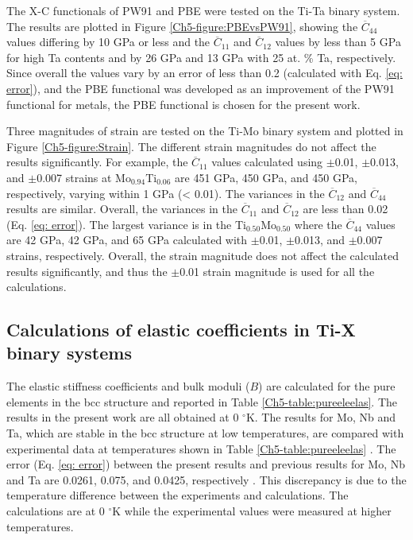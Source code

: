 The X-C functionals of PW91 and PBE were tested on the Ti-Ta binary system. The results are plotted in Figure \ref{Ch5-figure:PBEvsPW91}, showing the $\overline{C}_{44}$ values differing by 10 GPa or less and the $\overline{C}_{11}$ and $\overline{C}_{12}$ values by less than 5 GPa for high Ta contents and by 26 GPa and 13 GPa with 25 at. \% Ta, respectively. Since overall the values vary by an error of less than 0.2 (calculated with Eq. \ref{eq: error}), and the PBE functional was developed as an improvement of the PW91 functional for metals, the PBE functional is chosen for the present work. 

Three magnitudes of strain are tested on the Ti-Mo binary system and plotted in Figure \ref{Ch5-figure:Strain}. The different strain magnitudes do not affect the results significantly. For example, the $\overline{C}_{11}$ values calculated using $\pm$0.01, $\pm$0.013, and $\pm$0.007 strains at Mo$_{0.94}$Ti$_{0.06}$ are 451 GPa, 450 GPa, and 450 GPa, respectively, varying within 1 GPa (< 0.01). The variances in the $\overline{C}_{12}$ and $\overline{C}_{44}$ results are similar. Overall, the variances in the $\overline{C}_{11}$ and $\overline{C}_{12}$ are less than 0.02 (Eq. \ref{eq: error}). The largest variance is in the Ti$_{0.50}$Mo$_{0.50}$ where the $\overline{C}_{44}$ values are 42 GPa, 42 GPa, and 65 GPa calculated with $\pm$0.01, $\pm$0.013, and $\pm$0.007 strains, respectively. Overall, the strain magnitude does not affect the calculated results significantly, and thus the $\pm$0.01 strain magnitude is used for all the calculations.

\subsection{Calculations of elastic coefficients in Ti-X binary systems}

The elastic stiffness coefficients and bulk moduli ($B$) are calculated for the pure elements in the bcc structure and reported in Table \ref{Ch5-table:pureeleelas}. The results in the present work are all obtained at 0 $^\circ$K. The results for Mo, Nb and Ta, which are stable in the bcc structure at low temperatures, are compared with experimental data at temperatures shown in Table \ref{Ch5-table:pureeleelas} \cite{Dickinson1967a,Bolef1961}. The error (Eq. \ref{eq: error}) between the present results and previous results for Mo, Nb and Ta are 0.0261, 0.075, and 0.0425, respectively \cite{Simmons1971b,Dickinson1967a,Bolef1961}. This discrepancy is due to the temperature difference between the experiments and calculations. The calculations are at 0 $^\circ$K while the experimental values were measured at higher temperatures. 

